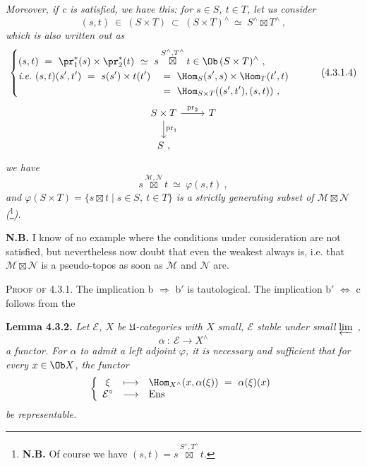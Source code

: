 \setcounter{footnote}{6}


\noindent\textit{Moreover, if c is satisfied, we have this: for $s\in S$, $t\in T$, let us consider}
\[
(s,t)\ \in\ (S\times T)\ \subset\ (S\times T)^\wedge\ \simeq\ S^\wedge\boxtimes T^\wedge\ ,
\]
\textit{which is also written out as}
\[
\left\{
\begin{aligned}
&\rlap{$\displaystyle (s,t)\ =\ \pr_1^*(s)\times\pr_2^*(t)\ \simeq\ s\overset{S^\wedge,T^\wedge}{\boxtimes}t\in\Ob\,(S\times T)^\wedge\ ,$}\\
&\textit{i.e.}\ (s,t)(s',t')\ =\ s(s')\times t(t') &&=\ \Hom_S(s',s)\times\Hom_T(t',t)\\
& &&=\ \Hom_{S\times T}((s',t'),(s,t))\ ,
\end{aligned}
\right.
\tag*{(4.3.1.4)}
\]
\[
\begin{tikzcd}
S\times T \arrow[r, "\mathrm{pr}_2"] \arrow[d, "\mathrm{pr}_1"] & T\\
S\ ,
\end{tikzcd}
\]
\textit{we have}
\[
s\overset{\mathcal M,\mathcal N}{\boxtimes}t\ \simeq\ \varphi(s,t)\ ,
\tag*{(4.3.1.4)}
\]
\textit{and $\varphi(S\times T)=\{s\boxtimes t\mid s\in S,\ t\in T\}$ is a strictly generating subset of $\mathcal M\boxtimes\mathcal N$ (}\footnote{\textbf{N.B.} Of course we have $(s,t)=s\overset{S^\wedge,T^\wedge}{\boxtimes}t$.}\textit{).}

\noindent\textbf{N.B.} I know of no example where the conditions under consideration are not satisfied, but nevertheless now doubt that even the weakest always is, i.e. that $\mathcal M\boxtimes\mathcal N$ is a pseudo-topos as soon as $\mathcal M$ and $\mathcal N$ are.

\noindent\textsc{Proof of} 4.3.1. The implication b $\Longrightarrow$ b$'$ is tautological. The implication b$'$ $\Longleftrightarrow$ c follows from the

\noindent\textbf{Lemma 4.3.2.} \textit{Let $\mathcal E$, $X$ be $\mathfrak U$-categories with $X$ small, $\mathcal E$ stable under small $\varprojlim$ ,}
\[
\alpha\ :\ \mathcal E\longrightarrow X^\wedge
\]
\textit{a functor. For $\alpha$ to admit a left adjoint $\varphi$, it is necessary and sufficient that for every $x\in\Ob X$, the functor}
\[
\left\{
\begin{array}{ccl}
\xi & \longmapsto & \Hom_{X^\wedge}(x,\alpha(\xi))\ =\ \alpha(\xi)(x)\\
\mathcal E^\circ & \longrightarrow & \mathrm{Ens}
\end{array}
\right.
\]
\textit{be representable.}


